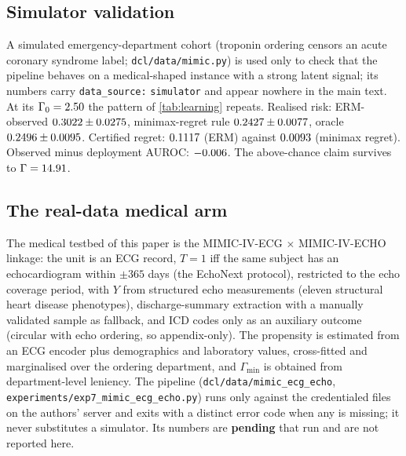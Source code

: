 \subsection{Simulator validation}
\label{app:simulator}

A simulated emergency-department cohort (troponin ordering censors an acute
coronary syndrome label; \texttt{dcl/\allowbreak data/\allowbreak mimic.py}) is used only to check
that the pipeline behaves on a medical-shaped instance with a strong latent
signal; its numbers carry \texttt{data\_source:} \texttt{simulator} and appear nowhere
in the main text. At its $\Gamma_0=2.50$ the pattern of
\cref{tab:learning} repeats. Realised risk: ERM-observed
$0.3022 \pm 0.0275$, minimax-regret rule
$0.2427 \pm 0.0077$,
oracle $0.2496 \pm 0.0095$.
Certified regret: $0.1117$ (ERM) against
$0.0093$ (minimax regret). Observed minus
deployment AUROC: $-0.006$. The above-chance claim
survives to $\Gamma=14.91$.

\subsection{The real-data medical arm}
\label{app:medical}

The medical testbed of this paper is the MIMIC-IV-ECG $\times$ MIMIC-IV-ECHO
linkage: the unit is an ECG record, $T=1$ iff the same subject has an
echocardiogram within $\pm365$ days (the EchoNext protocol), restricted to
the echo coverage period, with $Y$ from structured echo measurements (eleven
structural heart disease phenotypes), discharge-summary extraction with a
manually validated sample as fallback, and ICD codes only as an auxiliary
outcome (circular with echo ordering, so appendix-only). The propensity is
estimated from an ECG encoder plus demographics and laboratory values,
cross-fitted and marginalised over the ordering department, and
$\Gamma_{\min}$ is obtained from department-level leniency. The pipeline
(\texttt{dcl/data/mimic\_ecg\_echo}, \texttt{experiments/exp7\_mimic\_ecg\_echo.py})
runs only against the credentialed files on the authors' server and exits
with a distinct error code when any is missing; it never substitutes a
simulator. Its numbers are \textbf{pending} that run and are not reported
here.

